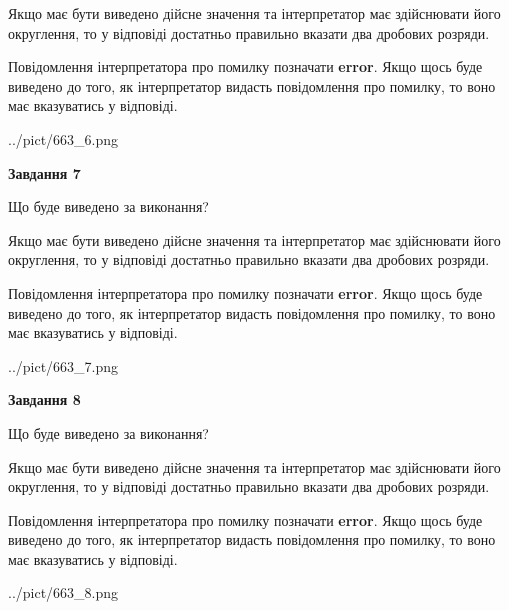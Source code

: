 \documentclass[12pt, ukrainian]{article}
\begin{document}
{\begin {Large}
Якщо має бути виведено дійсне значення та інтерпретатор має здійснювати його округлення, 
то у відповіді достатньо правильно вказати два дробових розряди.

Повідомлення інтерпретатора про помилку позначати \textbf{error}.
Якщо щось буде виведено до того, як інтерпретатор видасть повідомлення про помилку, 
то воно має вказуватись у відповіді. \par

\begin{center}
	{../pict/663_6.png}
\end{center}
\newpage

{\begin {center}\textbf{Завдання 7}\end {center}}\par
Що буде виведено за виконання? \par

Якщо має бути виведено дійсне значення та інтерпретатор має здійснювати його округлення, 
то у відповіді достатньо правильно вказати два дробових розряди.

Повідомлення інтерпретатора про помилку позначати \textbf{error}.
Якщо щось буде виведено до того, як інтерпретатор видасть повідомлення про помилку, 
то воно має вказуватись у відповіді. \par

\begin{center}
	{../pict/663_7.png}
\end{center}
\newpage

{\begin {center}\textbf{Завдання 8}\end {center}}\par
Що буде виведено за виконання? \par

Якщо має бути виведено дійсне значення та інтерпретатор має здійснювати його округлення, 
то у відповіді достатньо правильно вказати два дробових розряди.

Повідомлення інтерпретатора про помилку позначати \textbf{error}.
Якщо щось буде виведено до того, як інтерпретатор видасть повідомлення про помилку, 
то воно має вказуватись у відповіді. \par

\begin{center}
	{../pict/663_8.png}
\end{center}
\newpage


\end{Large}}
\end{document}
